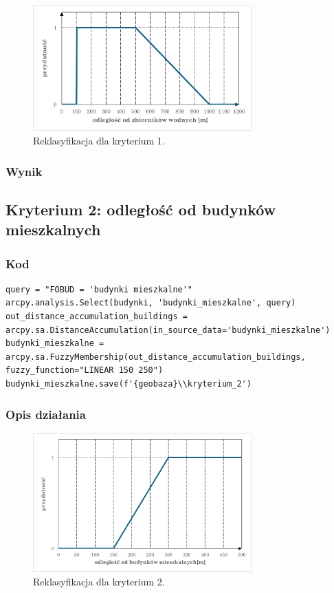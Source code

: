 \documentclass{article}
\begin{document}
\begin{figure}[H]
    \centering
    \includegraphics[width=0.75\textwidth]{img/kryterium1-wykres-glowny.png}
    \caption*{Reklasyfikacja dla kryterium 1.}
\end{figure}
\subsubsection{Wynik}
\newpage
\subsection{Kryterium 2: odległość od budynków mieszkalnych}
\subsubsection{Kod}
\begin{lstlisting}
query = "FOBUD = 'budynki mieszkalne'"
arcpy.analysis.Select(budynki, 'budynki_mieszkalne', query)
out_distance_accumulation_buildings = arcpy.sa.DistanceAccumulation(in_source_data='budynki_mieszkalne')
budynki_mieszkalne = arcpy.sa.FuzzyMembership(out_distance_accumulation_buildings, fuzzy_function="LINEAR 150 250")
budynki_mieszkalne.save(f'{geobaza}\\kryterium_2')
\end{lstlisting}

\subsubsection{Opis działania}
\begin{figure}[H]
    \centering
    \includegraphics[width=0.75\textwidth]{img/kryterium2-wykres-glowny.png}
    \caption*{Reklasyfikacja dla kryterium 2.}
\end{figure}
\end{document}
